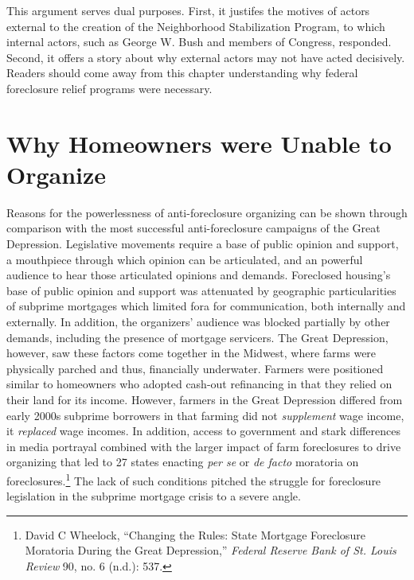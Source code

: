 \documentclass[12pt,oneside]{psthesis}
\begin{document}
This argument serves dual purposes.
First, it justifes the motives of actors external to the creation of the Neighborhood Stabilization Program, to which internal actors, such as George W. Bush and members of Congress, responded.
Second, it offers a story about why external actors may not have acted decisively.
Readers should come away from this chapter understanding why federal foreclosure relief programs were necessary.

\hypertarget{homeowners}{%
\section{Why Homeowners were Unable to Organize}\label{homeowners}}

Reasons for the powerlessness of anti-foreclosure organizing can be shown through comparison with the most successful anti-foreclosure campaigns of the Great Depression.
Legislative movements require a base of public opinion and support, a mouthpiece through which opinion can be articulated, and an powerful audience to hear those articulated opinions and demands.
Foreclosed housing's base of public opinion and support was attenuated by geographic particularities of subprime mortgages which limited fora for communication, both internally and externally.
In addition, the organizers' audience was blocked partially by other demands, including the presence of mortgage servicers.
The Great Depression, however, saw these factors come together in the Midwest, where farms were physically parched and thus, financially underwater.
Farmers were positioned similar to homeowners who adopted cash-out refinancing in that they relied on their land for its income.
However, farmers in the Great Depression differed from early 2000s subprime borrowers in that farming did not \emph{supplement} wage income, it \emph{replaced} wage incomes.
In addition, access to government and stark differences in media portrayal combined with the larger impact of farm foreclosures to drive organizing that led to 27 states enacting \emph{per se} or \emph{de facto} moratoria on foreclosures.\footnote{David C Wheelock, ``Changing the Rules: State Mortgage Foreclosure Moratoria During the Great Depression,'' \emph{Federal Reserve Bank of St. Louis Review} 90, no. 6 (n.d.): 537.}
The lack of such conditions pitched the struggle for foreclosure legislation in the subprime mortgage crisis to a severe angle.
\end{document}
